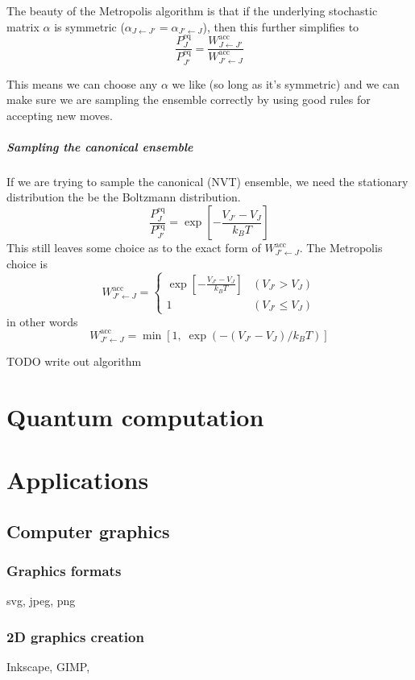 \documentclass{report}
\begin{document}
The beauty of the Metropolis algorithm is that if the underlying stochastic matrix $\alpha$ is symmetric ($\alpha_{J\leftarrow J'} = \alpha_{J'\leftarrow J}$), then this further simplifies to
\[ \frac{P^\text{eq}_J}{P^\text{eq}_{J'}} = \frac{W^\text{acc}_{J\leftarrow J'}}{W^\text{acc}_{J'\leftarrow J}} \]

This means we can choose any $\alpha$ we like (so long as it's symmetric) and we can make sure we are sampling the ensemble correctly by using good rules for accepting new moves.

\subsubsection{Sampling the canonical ensemble}
If we are trying to sample the canonical (NVT) ensemble, we need the stationary distribution the be the Boltzmann distribution.
\[ \frac{P^\text{eq}_J}{P^\text{eq}_{J'}} = \exp\left[- \frac{V_{J'}-V_J}{k_BT}\right] \]
This still leaves some choice as to the exact form of $W^\text{acc}_{J'\leftarrow J}$. The Metropolis choice is
\[ W^\text{acc}_{J'\leftarrow J} = \begin{cases}
\exp\left[- \frac{V_{J'}-V_J}{k_BT}\right] & (V_{J'}>V_J) \\
1 & (V_{J'}\leq V_J)
\end{cases} \]
in other words
\[ W^\text{acc}_{J'\leftarrow J} = \min \left[1, \; \exp\left(-(V_{J'}-V_J) / k_BT\right)\right] \]

TODO write out algorithm

\part{Quantum computation}


\part{Applications}
\setcounter{chapter}{0} %
\chapter{Computer graphics}
\section{Graphics formats}
svg, jpeg, png
\section{2D graphics creation}
Inkscape, GIMP, 
\end{document}
